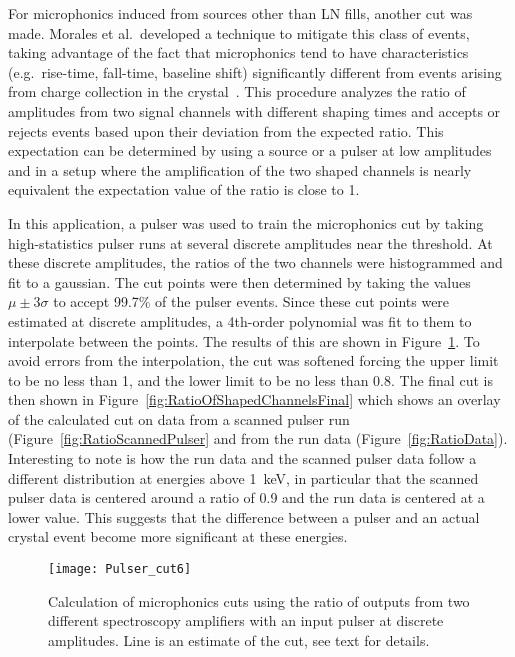 	For microphonics induced from sources other than LN fills, another cut was made.  Morales et al.~developed a technique to mitigate this class of events, taking advantage of the fact that microphonics tend to have characteristics (e.g.~rise-time, fall-time, baseline shift) significantly different from events arising from charge collection in the crystal~\cite{Morales1992410}.  This procedure analyzes the ratio of amplitudes from two signal channels with different shaping times  and accepts or rejects events based upon their deviation from the expected ratio.  This expectation can be determined by using a source or a pulser at low amplitudes and in a setup where the amplification of the two shaped channels is nearly equivalent the expectation value of the ratio is close to 1.  
	
	In this application, a pulser was used to train the microphonics cut by taking high-statistics pulser runs at several discrete amplitudes near the threshold.  At these discrete amplitudes, the ratios of the two channels were histogrammed and fit to a gaussian.  The cut points were then determined by taking the values $\mu \pm 3 \sigma$ to accept 99.7\% of the pulser events.  Since these cut points were estimated at discrete amplitudes, a 4th-order polynomial was fit to them to interpolate between the points.  The results of this are shown in Figure~\ref{fig:RatioOfShapedChannels}.  To avoid errors from the interpolation, the cut was softened forcing the upper limit to be no less than 1, and the lower limit to be no less than 0.8.  The final cut is then shown in Figure~\ref{fig:RatioOfShapedChannelsFinal} which shows an overlay of the calculated cut on data from a scanned pulser run (Figure~\ref{fig:RatioScannedPulser} and from the run data (Figure~\ref{fig:RatioData}).  Interesting to note is how the run data and the scanned pulser data follow a different distribution at energies above 1~keV, in particular that the scanned pulser data is centered around a ratio of 0.9 and the run data is centered at a lower value.  This suggests that the difference between a pulser and an actual crystal event become more significant at these energies.

			\begin{figure}
				\centering
				\texttt{[image: Pulser\_cut6]}
				\caption[Calculation of microphonics cuts]
				{Calculation of microphonics cuts using the ratio of outputs from two different spectroscopy amplifiers with an input pulser at discrete amplitudes.  Line is 
				an estimate of the cut, see text for details.}
				\label{fig:RatioOfShapedChannels}
			\end{figure}

